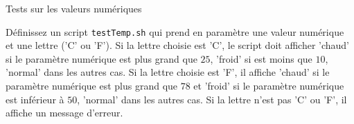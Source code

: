 \begin{exercice}
	 \begin{exercicelet}{Tests sur les valeurs numériques}
    \begin{questions}
    \item Définissez un script \texttt{testTemp.sh} qui prend en paramètre une valeur numérique et une lettre ('C' ou 'F'). Si la lettre choisie est 'C', le script doit afficher 'chaud' si le paramètre numérique est plus grand que $25$, 'froid' si est moins que $10$, 'normal' dans les autres cas. Si la lettre choisie est 'F', il affiche 'chaud' si le paramètre numérique est plus grand que $78$ et 'froid' si le paramètre numérique est inférieur à $50$, 'normal' dans les autres cas. Si la lettre n'est pas 'C' ou 'F', il affiche un message d'erreur. 
    \end{questions}
  \end{exercicelet}
\end{exercice}